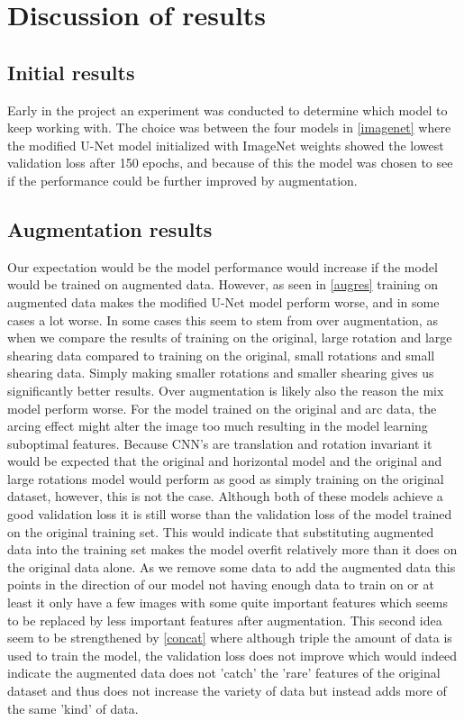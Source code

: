 \section{Discussion of results}
\subsection{Initial results}
Early in the project an experiment was conducted to determine which model to keep working with. The choice was between the four models in \autoref{imagenet} where the modified U-Net model initialized with ImageNet weights showed the lowest validation loss after 150 epochs, and because of this the model was chosen to see if the performance could be further improved by augmentation.

\subsection{Augmentation results}
Our expectation would be the model performance would increase if the model would be trained on augmented data. However, as seen in \autoref{augres} training on augmented data makes the modified U-Net model perform worse, and in some cases a lot worse. In some cases this seem to stem from over augmentation, as when we compare the results of training on the original, large rotation and large shearing data compared to training on the original, small rotations and small shearing data. Simply making smaller rotations and smaller shearing gives us significantly better results. Over augmentation is likely also the reason the mix model perform worse. For the model trained on the original and arc data, the arcing effect might alter the image too much resulting in the model learning suboptimal features. Because CNN's are translation and rotation invariant it would be expected that the original and horizontal model and the original and large rotations model would perform as good as simply training on the original dataset, however, this is not the case. Although both of these models achieve a good validation loss it is still worse than the validation loss of the model trained on the original training set. This would indicate that substituting augmented data into the training set makes the model overfit relatively more than it does on the original data alone. As we remove some data to add the augmented data this points in the direction of our model not having enough data to train on or at least it only have a few images with some quite important features which seems to be replaced by less important features after augmentation. This second idea seem to be strengthened by \autoref{concat} where although triple the amount of data is used to train the model, the validation loss does not improve which would indeed indicate the augmented data does not 'catch' the 'rare' features of the original dataset and thus does not increase the variety of data but instead adds more of the same 'kind' of data.\\

